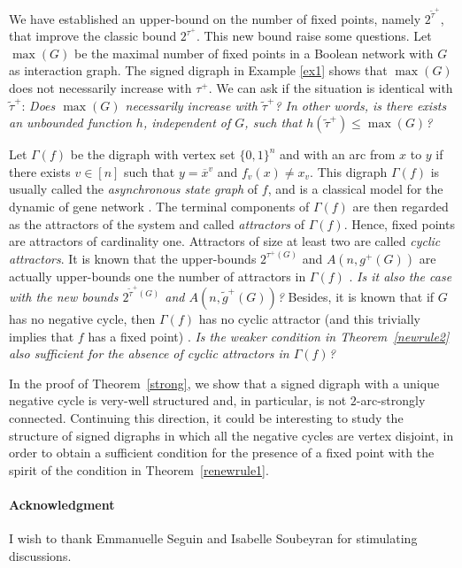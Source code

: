 \documentclass[11pt,a4paper]{article}
\def\B{\{0,1\}}
\begin{document}
\medskip
We have established an upper-bound on the number of fixed points, namely $2^{\tilde\tau^+}$, that improve the classic bound $2^{\tau^+}$. This new bound raise some questions. Let $\max(G)$ be the maximal number of fixed points in a Boolean network with $G$ as interaction graph. The signed digraph in Example \ref{ex1} shows that $\max(G)$ does not necessarily increase with $\tau^+$. We can ask if the situation is identical with $\tilde\tau^+$: {\em Does $\max(G)$ necessarily increase with $\tilde\tau^+$? In other words, is there exists an unbounded function $h$, independent of $G$, such that $h(\tilde\tau^+)\leq \max(G)$?} 

\medskip
Let $\Gamma(f)$ be the digraph with vertex set $\B^n$ and with an arc from $x$ to $y$ if there exists $v\in[n]$ such that $y=\overline{x}^v$ and $f_v(x)\neq x_v$. This digraph $\Gamma(f)$ is usually called the {\em asynchronous state graph} of $f$, and is a classical model for the dynamic of gene network \cite{TA90,TK01}. The terminal components of $\Gamma(f)$ are then regarded as the attractors of the system and called {\em attractors} of $\Gamma(f)$. Hence, fixed points are attractors of cardinality one. Attractors of size at least two are called {\em cyclic attractors}. It is known that the upper-bounds $2^{\tau^+(G)}$ and $A(n,g^+(G))$ are actually upper-bounds one the number of attractors in $\Gamma(f)$ \cite{R09}. {\em Is it also the case with the new bounds $2^{\tilde\tau^+(G)}$ and $A(n,\tilde g^+(G))$?} Besides, it is known that if $G$ has no negative cycle, then $\Gamma(f)$ has no cyclic attractor (and this trivially implies that $f$ has a fixed point) \cite{R10}. {\em Is the weaker condition in Theorem~\ref{newrule2} also sufficient for the absence of cyclic attractors in $\Gamma(f)$?} 


\medskip
In the proof of Theorem~\ref{strong}, we show that a signed digraph with a unique negative cycle is very-well structured and, in particular, is not $2$-arc-strongly connected. Continuing this direction, it could be interesting to study the structure of signed digraphs in which all the negative cycles are vertex disjoint, in order to obtain a sufficient condition for the presence of a fixed point with the spirit of the condition in Theorem~\ref{renewrule1}. 

\paragraph{Acknowledgment} I wish to thank Emmanuelle Seguin and Isabelle Soubeyran for stimulating discussions. 



\end{document}
